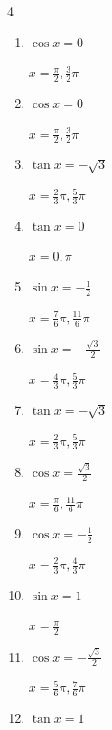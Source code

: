 \begin{multicols}{4}
\begin{enumerate}
        $\displaystyle x = \frac{7}{6}\pi , \frac{11}{6}\pi$

  \item $\displaystyle \cos{x}  = 0$

        $\displaystyle x = \frac{\pi}{2} , \frac{3}{2}\pi$

  \item $\displaystyle \cos{x}  = 0$

        $\displaystyle x = \frac{\pi}{2} , \frac{3}{2}\pi$

  \item $\displaystyle \tan{x}  = -\sqrt{3}$

        $\displaystyle x = \frac{2}{3}\pi , \frac{5}{3}\pi$

  \item $\displaystyle \tan{x}  = 0$

        $\displaystyle x = 0 , \pi$

  \item $\displaystyle \sin{x}  = -\frac{1}{2}$

        $\displaystyle x = \frac{7}{6}\pi , \frac{11}{6}\pi$

  \item $\displaystyle \sin{x}  = -\frac{\sqrt{3}}{2}$

        $\displaystyle x = \frac{4}{3}\pi , \frac{5}{3}\pi$

  \item $\displaystyle \tan{x}  = -\sqrt{3}$

        $\displaystyle x = \frac{2}{3}\pi , \frac{5}{3}\pi$

  \item $\displaystyle \cos{x}  = \frac{\sqrt{3}}{2}$

        $\displaystyle x = \frac{\pi}{6} , \frac{11}{6}\pi$

  \item $\displaystyle \cos{x}  = -\frac{1}{2}$

        $\displaystyle x = \frac{2}{3}\pi , \frac{4}{3}\pi$

  \item $\displaystyle \sin{x}  = 1$

        $\displaystyle x = \frac{\pi}{2}$

  \item $\displaystyle \cos{x}  = -\frac{\sqrt{3}}{2}$

        $\displaystyle x = \frac{5}{6}\pi , \frac{7}{6}\pi$

  \item $\displaystyle \tan{x}  = 1$


\end{enumerate}
\end{multicols}
